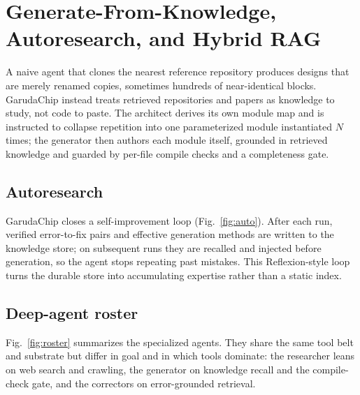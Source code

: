 \documentclass[conference]{IEEEtran}
\begin{document}
\section{Generate-From-Knowledge, Autoresearch, and Hybrid RAG}
A naive agent that clones the nearest reference repository produces designs that
are merely renamed copies, sometimes hundreds of near-identical blocks.
GarudaChip instead treats retrieved repositories and papers as knowledge to
study, not code to paste. The architect derives its own module map and is
instructed to collapse repetition into one parameterized module instantiated $N$
times; the generator then authors each module itself, grounded in retrieved
knowledge and guarded by per-file compile checks and a completeness gate.

\subsection{Autoresearch}
GarudaChip closes a self-improvement loop (Fig.~\ref{fig:auto}). After each run,
verified error-to-fix pairs and effective generation methods are written to the
knowledge store; on subsequent runs they are recalled and injected before
generation, so the agent stops repeating past mistakes. This Reflexion-style loop
turns the durable store into accumulating expertise rather than a static index.

\subsection{Deep-agent roster}
Fig.~\ref{fig:roster} summarizes the specialized agents. They share the same tool
belt and substrate but differ in goal and in which tools dominate: the researcher
leans on web search and crawling, the generator on knowledge recall and the
compile-check gate, and the correctors on error-grounded retrieval.
\end{document}

